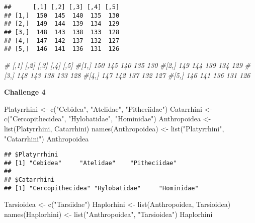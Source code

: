 \documentclass[
]{article}
\newenvironment{Shaded}{\begin{snugshade}}{\end{snugshade}}
\newcommand{\CommentTok}[1]{\textcolor[rgb]{0.56,0.35,0.01}{\textit{#1}}}
\newcommand{\FunctionTok}[1]{\textcolor[rgb]{0.00,0.00,0.00}{#1}}
\newcommand{\NormalTok}[1]{#1}
\newcommand{\OtherTok}[1]{\textcolor[rgb]{0.56,0.35,0.01}{#1}}
\newcommand{\StringTok}[1]{\textcolor[rgb]{0.31,0.60,0.02}{#1}}
\begin{document}
\begin{verbatim}
##      [,1] [,2] [,3] [,4] [,5]
## [1,]  150  145  140  135  130
## [2,]  149  144  139  134  129
## [3,]  148  143  138  133  128
## [4,]  147  142  137  132  127
## [5,]  146  141  136  131  126
\end{verbatim}

\begin{Shaded}
\begin{Highlighting}[]
\CommentTok{\#     [,1] [,2] [,3] [,4] [,5]}
\CommentTok{\#[1,]  150  145  140  135  130}
\CommentTok{\#[2,]  149  144  139  134  129}
\CommentTok{\#[3,]  148  143  138  133  128}
\CommentTok{\#[4,]  147  142  137  132  127}
\CommentTok{\#[5,]  146  141  136  131  126}
\end{Highlighting}
\end{Shaded}

\textbf{Challenge 4}

\begin{Shaded}
\begin{Highlighting}[]
\NormalTok{Platyrrhini }\OtherTok{\textless{}{-}} \FunctionTok{c}\NormalTok{(}\StringTok{"Cebidea"}\NormalTok{, }\StringTok{"Atelidae"}\NormalTok{, }\StringTok{"Pitheciidae"}\NormalTok{)}
\NormalTok{Catarrhini }\OtherTok{\textless{}{-}} \FunctionTok{c}\NormalTok{(}\StringTok{"Cercopithecidea"}\NormalTok{, }\StringTok{"Hylobatidae"}\NormalTok{, }\StringTok{"Hominidae"}\NormalTok{)}
\NormalTok{Anthropoidea }\OtherTok{\textless{}{-}} \FunctionTok{list}\NormalTok{(Platyrrhini, Catarrhini)}
\FunctionTok{names}\NormalTok{(Anthropoidea) }\OtherTok{\textless{}{-}} \FunctionTok{list}\NormalTok{(}\StringTok{"Platyrrhini"}\NormalTok{, }\StringTok{"Catarrhini"}\NormalTok{)}
\NormalTok{Anthropoidea}
\end{Highlighting}
\end{Shaded}

\begin{verbatim}
## $Platyrrhini
## [1] "Cebidea"     "Atelidae"    "Pitheciidae"
## 
## $Catarrhini
## [1] "Cercopithecidea" "Hylobatidae"     "Hominidae"
\end{verbatim}

\begin{Shaded}
\begin{Highlighting}[]
\NormalTok{Tarsioidea }\OtherTok{\textless{}{-}} \FunctionTok{c}\NormalTok{(}\StringTok{"Tarsiidae"}\NormalTok{)}
\NormalTok{Haplorhini }\OtherTok{\textless{}{-}} \FunctionTok{list}\NormalTok{(Anthropoidea, Tarsioidea)}
\FunctionTok{names}\NormalTok{(Haplorhini) }\OtherTok{\textless{}{-}} \FunctionTok{list}\NormalTok{(}\StringTok{"Anthropoidea"}\NormalTok{, }\StringTok{"Tarsioidea"}\NormalTok{)}
\NormalTok{Haplorhini}
\end{Highlighting}
\end{Shaded}
\end{document}
